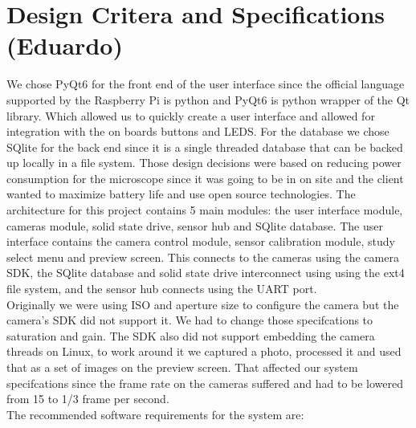 \section{Design Critera and Specifications (Eduardo)}
We chose PyQt6 for the front end of the user interface since the official language supported by the Raspberry Pi is python and PyQt6 is python wrapper of the Qt library. Which allowed us to quickly create a user interface and allowed for integration with the on boards buttons and LEDS. For the database we chose SQlite for the back end since it is a single threaded database that can be backed up locally in a file system. Those design decisions were based on reducing power consumption for the microscope since it was going to be in on site and the client wanted to maximize battery life and use open source technologies. The architecture for this project contains 5 main modules: the user interface module, cameras module, solid state drive, sensor hub and SQlite database. The user interface contains the camera control module, sensor calibration module, study select menu and preview screen. This connects to the cameras using the camera SDK, the SQlite database and solid state drive interconnect using using the ext4 file system, and the sensor hub connects using the UART port. 
\\ Originally we were using ISO and aperture size to configure the camera but the camera's SDK did not support it. We had to change those specifcations to saturation and gain. The SDK also did not support embedding the camera threads on Linux, to work around it we captured a photo, processed it and used that as a set of images on the preview screen. That affected our system specifcations since the frame rate on the cameras suffered and had to be lowered from 15 to 1/3 frame per second. \\
The recommended software requirements for the system are:
